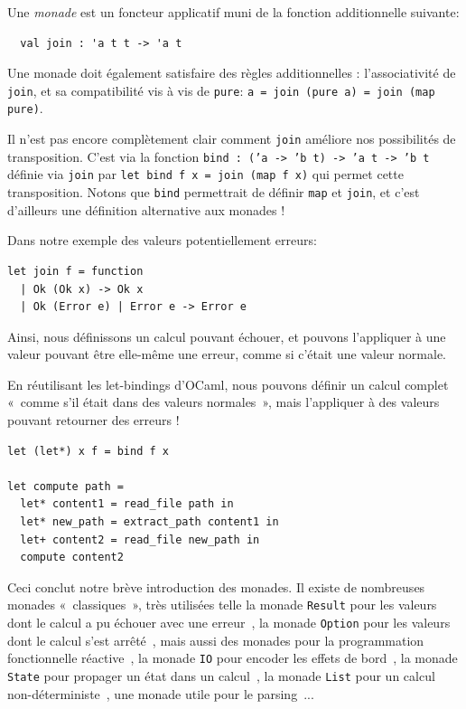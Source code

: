 \documentclass[final]{jflart}
\begin{document}
\begin{defi}[Monades]
  Une \emph{monade} est un foncteur applicatif muni de la fonction additionnelle suivante:

  \begin{verbatim}
  val join : 'a t t -> 'a t
  \end{verbatim}

  Une monade doit également satisfaire des règles additionnelles :
  l'associativité de \texttt{join}, et sa compatibilité vis à vis de
  \texttt{pure}: \texttt{a = join (pure a) = join (map pure)}.
\end{defi}

Il n'est pas encore complètement clair comment \texttt{join} améliore nos
possibilités de transposition. C'est via la fonction \texttt{bind : ('a -> 'b t)
  -> 'a t -> 'b t} définie via \texttt{join} par \texttt{let bind f x = join (map f x)} qui permet cette transposition. Notons que \texttt{bind} permettrait de définir \texttt{map} et \texttt{join}, et c'est d'ailleurs une définition alternative aux monades !

Dans notre exemple des valeurs potentiellement erreurs:

\begin{verbatim}
let join f = function
  | Ok (Ok x) -> Ok x
  | Ok (Error e) | Error e -> Error e
\end{verbatim}

Ainsi, nous définissons un calcul pouvant échouer, et pouvons l'appliquer à une
valeur pouvant être elle-même une erreur, comme si c'était une valeur normale.

En réutilisant les let-bindings d'OCaml, nous pouvons définir un calcul complet
«~comme s'il était dans des valeurs normales~», mais l'appliquer à des valeurs
pouvant retourner des erreurs !

\begin{verbatim}
let (let*) x f = bind f x

let compute path =
  let* content1 = read_file path in
  let* new_path = extract_path content1 in
  let+ content2 = read_file new_path in
  compute content2
\end{verbatim}

Ceci conclut notre brève introduction des monades. Il existe de nombreuses monades «~classiques~», très utilisées telle la monade \texttt{Result} pour les valeurs dont le calcul a pu échouer avec une erreur~\cite{monads}, la monade \texttt{Option} pour les valeurs dont le calcul s'est arrêté~\cite{monads}, mais aussi des monades pour la programmation fonctionnelle réactive~\cite{lwd,incremental}, la monade \texttt{IO} pour encoder les effets de bord~\cite{haskellIO}, la monade \texttt{State} pour propager un état dans un calcul~\cite{monads}, la monade \texttt{List} pour un calcul non-déterministe~\cite{monads}, une monade utile pour le parsing~\cite{angstrom}...
\end{document}
